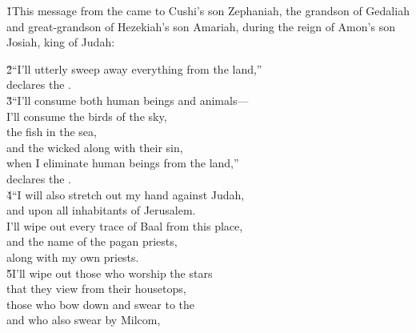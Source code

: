 


\v{1}This message from the  came to Cushi's son Zephaniah, the grandson of Gedaliah and great-grandson of Hezekiah's son Amariah, during the reign of Amon's son Josiah, king of Judah:

\begin{poetry}
\poeml \v{2}``I'll utterly sweep away everything from the land,'' \\
\poemll    declares the . \\
\poeml \v{3}``I'll consume both human beings and animals--- \\
\poemll    I'll consume the birds of the sky, \\
\poeml the fish in the sea, \\
\poemll    and the wicked along with their sin, \\
\poeml when I eliminate human beings from the land,'' \\
\poemlll       declares the . \\
\poeml \v{4}``I will also stretch out my hand against Judah, \\
\poemll    and upon all inhabitants of Jerusalem. \\
\poeml I'll wipe out every trace of Baal from this place, \\
\poemll    and the name of the pagan priests, \\
\poemlll       along with my own priests. \\
\poeml \v{5}I'll wipe out those who worship the stars \\
\poemll    that they view from their housetops, \\
\poeml those who bow down and swear to the  \\
\poemll    and who also swear by Milcom, \\

\end{poetry}
